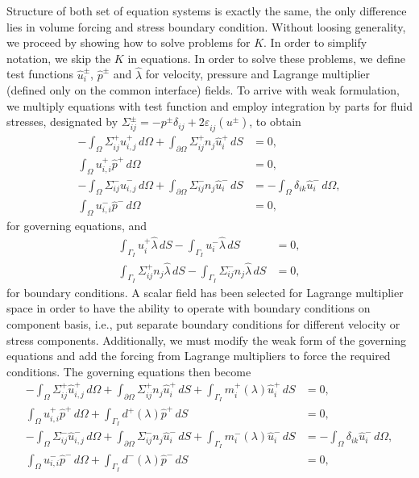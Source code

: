 \documentclass[12pt,a4paper]{article}
\newcommand{\pd}{\partial}
\newcommand{\str}[3]{\varepsilon^{#1}_{#2} \left( #3 \right)}
\begin{document}
Structure of both set of equation systems is exactly the same, the only difference lies in volume forcing and stress boundary condition. Without loosing generality, we proceed by showing how to solve problems for $K$. In order to simplify notation, we skip the $K$ in equations. In order to solve these problems, we define test functions $\hat{u}_i^{\pm}$, $\hat{p}^{\pm}$ and $\hat{\lambda}$ for velocity, pressure and Lagrange multiplier (defined only on the common interface) fields. To arrive with weak formulation, we multiply equations with test function and employ integration by parts for fluid stresses, designated by $\Sigma^{\pm}_{ij} = - p^{\pm} \delta_{ij} + 2 \str{}{ij}{u^{\pm}} $, to obtain
\begin{align}
- \int_{\Omega} \Sigma^{+}_{ij} \hat{u}^{+}_{i,j} \,\mathit{d\Omega} + \int_{\pd \Omega} \Sigma^{+}_{ij} n_j \hat{u}^{+}_{i} \,\mathit{dS} & = 0, \\
\int_{\Omega} u^{{+}}_{i,i} \hat{p}^{+} \,\mathit{d\Omega} & = 0, \\
- \int_{\Omega} \Sigma^{-}_{ij} \hat{u}^{-}_{i,j} \,\mathit{d\Omega} + \int_{\pd \Omega} \Sigma^{-}_{ij} n_j \hat{u}^{-}_{i} \,\mathit{dS} & = -\int_{\Omega} \delta_{ik} \hat{u}^{-}_{i} \,\mathit{d\Omega},  \\
\int_{\Omega} u^{{-}}_{i,i} \hat{p}^{-} \,\mathit{d\Omega} & = 0,
\end{align}
for governing equations, and
\begin{align}
\int_{\Gamma_I} u^{+}_{i} \hat{\lambda} \,\mathit{dS} -  \int_{\Gamma_I} u^{-}_{i} \hat{\lambda} \,\mathit{dS} & = 0,  \\
\int_{\Gamma_I} \Sigma^{+}_{ij} n_j \hat{\lambda} \,\mathit{dS} - \int_{\Gamma_I} \Sigma^{-}_{ij} n_j \hat{\lambda} \,\mathit{dS}  & = 0,
\end{align}
for boundary conditions. A scalar field has been selected for Lagrange multiplier space in order to have the ability to operate with boundary conditions on component basis, i.e., put separate boundary conditions for different velocity or stress components. Additionally, we must modify the weak form of the governing equations and add the forcing from Lagrange multipliers to force the required conditions. The governing equations then become
\begin{align}
- \int_{\Omega} \Sigma^{+}_{ij} \hat{u}^{+}_{i,j} \,\mathit{d\Omega} + \int_{\pd \Omega} \Sigma^{+}_{ij} n_j \hat{u}^{+}_{i} \,\mathit{dS} + \int_{\Gamma_I} m^{+}_{i} \left(\lambda\right) \hat{u}^{+}_i \,\mathit{dS} & = 0, \\
\int_{\Omega} u^{{+}}_{i,i} \hat{p}^{+} \,\mathit{d\Omega} + \int_{\Gamma_I} d^{+} \left(\lambda\right) \hat{p}^{+} \,\mathit{dS} & = 0, \\
- \int_{\Omega} \Sigma^{-}_{ij} \hat{u}^{-}_{i,j} \,\mathit{d\Omega} + \int_{\pd \Omega} \Sigma^{-}_{ij} n_j \hat{u}^{-}_{i} \,\mathit{dS} + \int_{\Gamma_I} m^{-}_{i} \left(\lambda\right) \hat{u}^{-}_i \,\mathit{dS} & = -\int_{\Omega} \delta_{ik} \hat{u}^{-}_{i} \,\mathit{d\Omega},  \\
\int_{\Omega} u^{{-}}_{i,i} \hat{p}^{-} \,\mathit{d\Omega} + \int_{\Gamma_I} d^{-} \left(\lambda\right) \hat{p}^{-} \,\mathit{dS} & = 0,
\end{align}
\end{document}
